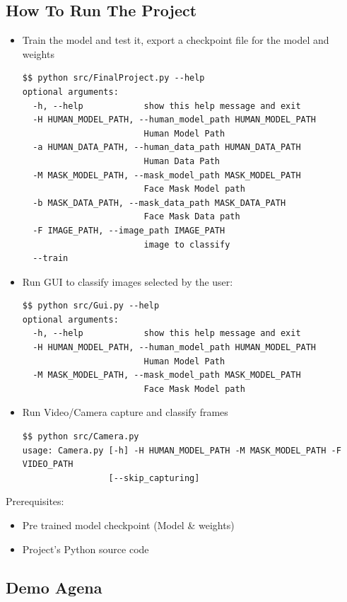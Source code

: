\subsection{How To Run The Project}
\begin{itemize}
\item Train the model and test it, export a checkpoint file for the model and weights
\begin{verbatim}
$$ python src/FinalProject.py --help
optional arguments:
  -h, --help            show this help message and exit
  -H HUMAN_MODEL_PATH, --human_model_path HUMAN_MODEL_PATH
                        Human Model Path
  -a HUMAN_DATA_PATH, --human_data_path HUMAN_DATA_PATH
                        Human Data Path
  -M MASK_MODEL_PATH, --mask_model_path MASK_MODEL_PATH
                        Face Mask Model path
  -b MASK_DATA_PATH, --mask_data_path MASK_DATA_PATH
                        Face Mask Data path
  -F IMAGE_PATH, --image_path IMAGE_PATH
                        image to classify
  --train
\end{verbatim}

\item{Run GUI to classify images selected by the user:}
\begin{verbatim}
$$ python src/Gui.py --help
optional arguments:
  -h, --help            show this help message and exit
  -H HUMAN_MODEL_PATH, --human_model_path HUMAN_MODEL_PATH
                        Human Model Path
  -M MASK_MODEL_PATH, --mask_model_path MASK_MODEL_PATH
                        Face Mask Model path
\end{verbatim}
    \item{Run Video/Camera capture and classify frames}
    \begin{verbatim}
$$ python src/Camera.py
usage: Camera.py [-h] -H HUMAN_MODEL_PATH -M MASK_MODEL_PATH -F VIDEO_PATH
                 [--skip_capturing]

    \end{verbatim}
\end{itemize}

Prerequisites:
\begin{itemize}
    \item Pre trained model checkpoint (Model \& weights)
    \item Project's Python source code
\end{itemize}

\subsection{Demo Agena}
